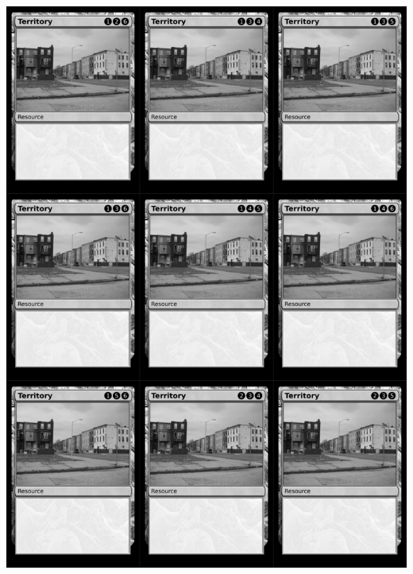 \documentclass[a4paper]{article}
\begin{document}
\newpage

\begin{center}
	\centering
	\includegraphics[width=200.5mm,height=280.7mm]{output/temp/page26.png}
\end{center}
\end{document}
